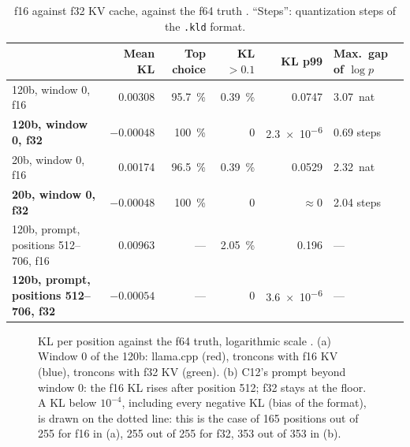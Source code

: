 \begin{table}[ht]
\centering\footnotesize
\caption[f16 against f32 KV cache]{f16 against f32 KV cache, against the f64 truth \mes. ``Steps'': quantization steps of the \texttt{.kld} format.}
\label{t2res-tab:kv}
\begin{tabularx}{\linewidth}{@{}>{\raggedright\arraybackslash}Xrrrrl@{}}
\toprule
& Mean KL & Top choice & KL $> 0.1$ & KL p99 & Max.\ gap of $\log p$ \\
\midrule
120b, window 0, f16 & \num{0.00308} & \SI{95.7}{\percent} & \SI{0.39}{\percent} & \num{0.0747} & \SI{3.07}{nat} \\
\textbf{120b, window 0, f32} & $-\num{0.00048}$ & \SI{100}{\percent} & 0 & \num{2.3e-6} & \num{0.69} steps \\
20b, window 0, f16 & \num{0.00174} & \SI{96.5}{\percent} & \SI{0.39}{\percent} & \num{0.0529} & \SI{2.32}{nat} \\
\textbf{20b, window 0, f32} & $-\num{0.00048}$ & \SI{100}{\percent} & 0 & $\approx 0$ & \num{2.04} steps \\
120b, prompt, positions 512--706, f16 & \num{0.00963} & --- & \SI{2.05}{\percent} & \num{0.196} & --- \\
\textbf{120b, prompt, positions 512--706, f32} & $-\num{0.00054}$ & --- & 0 & \num{3.6e-6} & --- \\
\bottomrule
\end{tabularx}
\end{table}

\begin{figure}[ht]
\centering
\GrapheResKL
\caption[KL per position against the f64 truth]{KL per position against the f64 truth, logarithmic scale \mes. (a) Window 0 of the 120b: llama.cpp (red), troncons with f16 KV (blue), troncons with f32 KV (green). (b) C12's prompt beyond window 0: the f16 KL rises after position 512; f32 stays at the floor. A KL below $10^{-4}$, including every negative KL (bias of the format), is drawn on the dotted line: this is the case of 165 positions out of 255 for f16 in (a), 255 out of 255 for f32, 353 out of 353 in (b).}
\label{t2res-fig:kl}
\end{figure}

